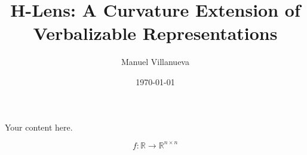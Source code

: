 \documentclass{article}
\title{H-Lens: A Curvature Extension of Verbalizable Representations}
\author{Manuel Villanueva}
\date{\today}
\begin{document}
\maketitle

Your content here.

\[
f: \mathbb{R} \to \mathbb{R}^{n \times n}
\]
\end{document}
